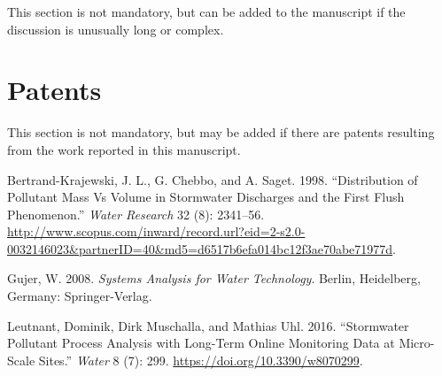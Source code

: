 \documentclass[
]{article}
\newlength{\cslhangindent}
\newlength{\cslentryspacingunit} %
\newenvironment{CSLReferences}[2] %
 {%
  \setlength{\parindent}{0pt}
  \ifodd #1
  \let\oldpar\par
  \def\par{\hangindent=\cslhangindent\oldpar}
  \fi
  \setlength{\parskip}{#2\cslentryspacingunit}
 }%
 {}
\begin{document}
This section is not mandatory, but can be added to the manuscript if the
discussion is unusually long or complex.

\hypertarget{patents}{%
\section{Patents}\label{patents}}

This section is not mandatory, but may be added if there are patents resulting
from the work reported in this manuscript.

\hypertarget{refs}{}
\begin{CSLReferences}{1}{0}
\leavevmode{}%
Bertrand-Krajewski, J. L., G. Chebbo, and A. Saget. 1998. {``Distribution of Pollutant Mass Vs Volume in Stormwater Discharges and the First Flush Phenomenon.''} \emph{Water Research} 32 (8): 2341--56. \url{http://www.scopus.com/inward/record.url?eid=2-s2.0-0032146023\&partnerID=40\&md5=d6517b6efa014bc12f3ae70abe71977d}.

\leavevmode{}%
Gujer, W. 2008. \emph{Systems {Analysis} for {Water} {Technology}}. Berlin, Heidelberg, Germany: Springer-Verlag.

\leavevmode{}%
Leutnant, Dominik, Dirk Muschalla, and Mathias Uhl. 2016. {``Stormwater {Pollutant} {Process} {Analysis} with {Long}-{Term} {Online} {Monitoring} {Data} at {Micro}-{Scale} {Sites}.''} \emph{Water} 8 (7): 299. \url{https://doi.org/10.3390/w8070299}.

\end{CSLReferences}
\end{document}
